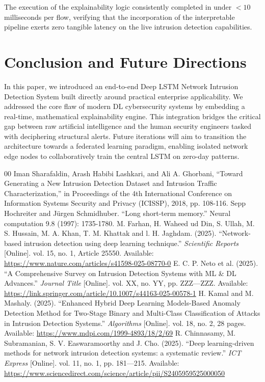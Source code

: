\documentclass[conference]{IEEEtran}
\begin{document}
The execution of the explainability logic consistently completed in under $<10$ milliseconds per flow, verifying that the incorporation of the interpretable pipeline exerts zero tangible latency on the live intrusion detection capabilities.

\section{Conclusion and Future Directions}
In this paper, we introduced an end-to-end Deep LSTM Network Intrusion Detection System built directly around practical enterprise applicability. We addressed the core flaw of modern DL cybersecurity systems by embedding a real-time, mathematical explainability engine. This integration bridges the critical gap between raw artificial intelligence and the human security engineers tasked with deciphering structural alerts. Future iterations will aim to transition the architecture towards a federated learning paradigm, enabling isolated network edge nodes to collaboratively train the central LSTM on zero-day patterns.

\begin{thebibliography}{00}
 Iman Sharafaldin, Arash Habibi Lashkari, and Ali A. Ghorbani, ``Toward Generating a New Intrusion Detection Dataset and Intrusion Traffic Characterization,'' in Proceedings of the 4th International Conference on Information Systems Security and Privacy (ICISSP), 2018, pp. 108-116.
 Sepp Hochreiter and Jürgen Schmidhuber. ``Long short-term memory.'' Neural computation 9.8 (1997): 1735-1780.
 M. Farhan, H. Waheed ud Din, S. Ullah, M. S. Hussain, M. A. Khan, T. M. Khattak and l. H. Jaghdam. (2025). ``Network-based intrusion detection using deep learning technique.'' \textit{Scientific Reports} [Online]. vol. 15, no. 1, Article 25550. Available: \url{https://www.nature.com/articles/s41598-025-08770-0}
 E. C. P. Neto et al. (2025). ``A Comprehensive Survey on Intrusion Detection Systems with ML \& DL Advances.'' \textit{Journal Title} [Online]. vol. XX, no. YY, pp. ZZZ—ZZZ. Available: \url{https://link.springer.com/article/10.1007/s44163-025-00578-1}
 H. Kamal and M. Mashaly. (2025). ``Enhanced Hybrid Deep Learning Models-Based Anomaly Detection Method for Two-Stage Binary and Multi-Class Classification of Attacks in Intrusion Detection Systems.'' \textit{Algorithms} [Online]. vol. 18, no. 2, 28 pages. Available: \url{https://www.mdpi.com/1999-4893/18/2/69}
 R. Chinnasamy, M. Subramanian, S. V. Easwaramoorthy and J. Cho. (2025). ``Deep learning-driven methods for network intrusion detection systems: a systematic review.'' \textit{ICT Express} [Online]. vol. 11, no. 1, pp. 181—215. Available: \url{https://www.sciencedirect.com/science/article/pii/S2405959525000050}
\end{thebibliography}
\end{document}
